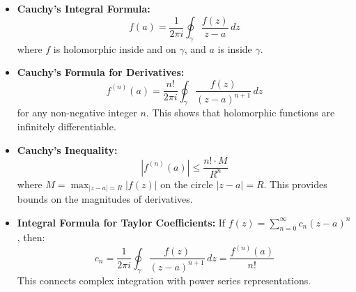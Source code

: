 \begin{itemize}
  \item \textbf{Cauchy's Integral Formula:} 
  \[f(a) = \frac{1}{2\pi i} \oint_{\gamma} \frac{f(z)}{z-a} \, dz\]
  where $f$ is holomorphic inside and on $\gamma$, and $a$ is inside $\gamma$.
  
  \item \textbf{Cauchy's Formula for Derivatives:} 
  \[f^{(n)}(a) = \frac{n!}{2\pi i} \oint_{\gamma} \frac{f(z)}{(z-a)^{n+1}} \, dz\]
  for any non-negative integer $n$. This shows that holomorphic functions are infinitely differentiable.
  
  \item \textbf{Cauchy's Inequality:} 
  \[|f^{(n)}(a)| \leq \frac{n! \cdot M}{R^n}\]
  where $M = \max_{|z-a|=R} |f(z)|$ on the circle $|z-a| = R$. This provides bounds on the magnitudes of derivatives.
  
  \item \textbf{Integral Formula for Taylor Coefficients:} If $f(z) = \sum_{n=0}^{\infty} c_n (z-a)^n$, then:
  \[c_n = \frac{1}{2\pi i} \oint_{\gamma} \frac{f(z)}{(z-a)^{n+1}} \, dz = \frac{f^{(n)}(a)}{n!}\]
  This connects complex integration with power series representations.
\end{itemize}

